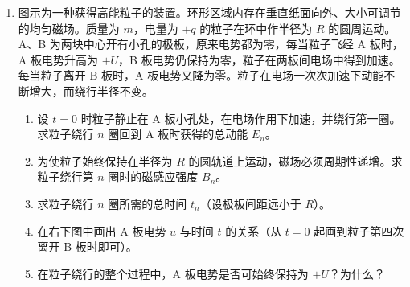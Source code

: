 \documentclass[\gkver]{gaokaozhenti}
\begin{document}
\begin{enumerate}
\item
图示为一种获得高能粒子的装置。环形区域内存在垂直纸面向外、大小可调节的均匀磁场。质量为 $m$，电量为 $+q$ 的粒子在环中作半径为 $R$ 的圆周运动。A、B 为两块中心开有小孔的极板，原来电势都为零，每当粒子飞经 A 板时，A 板电势升高为 $+U$，B 板电势仍保持为零，粒子在两板间电场中得到加速。每当粒子离开 B 板时，A 板电势又降为零。粒子在电场一次次加速下动能不断增大，而绕行半径不变。
\begin{enumerate}
	\item
	设 $t = 0$ 时粒子静止在 A 板小孔处，在电场作用下加速，并绕行第一圈。求粒子绕行 $n$ 圈回到 A 板时获得的总动能 $E_{n}$。
	\item
	为使粒子始终保持在半径为 $R$ 的圆轨道上运动，磁场必须周期性递增。求粒子绕行第 $n$ 圈时的磁感应强度 $B_{n}$。
	\item
	求粒子绕行 $n$ 圈所需的总时间 $t_{n}$（设极板间距远小于 $R$）。
	\item
	在右下图中画出 A 板电势 $u$ 与时间 $t$ 的关系（从 $t = 0$ 起画到粒子第四次离开 B 板时即可）。
	\item
	在粒子绕行的整个过程中，A 板电势是否可始终保持为 $+U$？为什么？
\end{enumerate}
\twopicture[labelA=1992上海29a, labelB=1992上海29b, align=right, wA=4.66cm, wB=5.19cm]
{}
{}

\end{enumerate}
\end{document}

